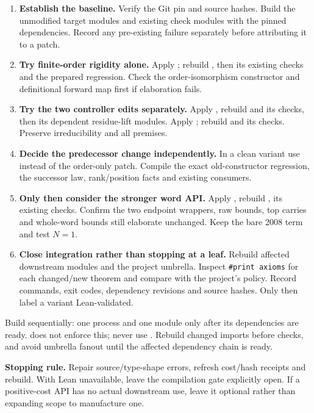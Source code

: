 \begin{enumerate}
\item \textbf{Establish the baseline.} Verify the Git pin and source hashes. Build the unmodified target modules and existing check modules with the pinned dependencies. Record any pre-existing failure separately before attributing it to a patch.
\item \textbf{Try finite-order rigidity alone.} Apply ; rebuild , then its existing checks and the prepared regression. Check the order-isomorphism constructor and definitional forward map first if elaboration fails.
\item \textbf{Try the two controller edits separately.} Apply , rebuild  and its checks, then its dependent residue-lift modules. Apply ; rebuild  and its checks. Preserve irreducibility and all  premises.
\item \textbf{Decide the predecessor change independently.} In a clean variant use  instead of the order-only patch. Compile the exact old-constructor  regression, the successor law, rank/position facts and existing consumers.
\item \textbf{Only then consider the stronger word API.} Apply , rebuild , its existing checks. Confirm the two endpoint wrappers, raw bounds, top carries and whole-word bounds still elaborate unchanged. Keep the bare 2008 term and test \(N=1\).
\item \textbf{Close integration rather than stopping at a leaf.} Rebuild affected downstream modules and the project umbrella. Inspect \texttt{\#print axioms} for each changed/new theorem and compare with the project's policy. Record commands, exit codes, dependency revisions and source hashes. Only then label a variant Lean-validated.
\end{enumerate}

Build sequentially: one process and one module only after its dependencies are ready.  does not enforce this; never use . Rebuild changed imports before checks, and avoid umbrella fanout until the affected dependency chain is ready.

\textbf{Stopping rule.} Repair source/type-shape errors, refresh cost/hash receipts and rebuild. With Lean unavailable, leave the compilation gate explicitly open. If a positive-cost API has no actual downstream use, leave it optional rather than expanding scope to manufacture one.
